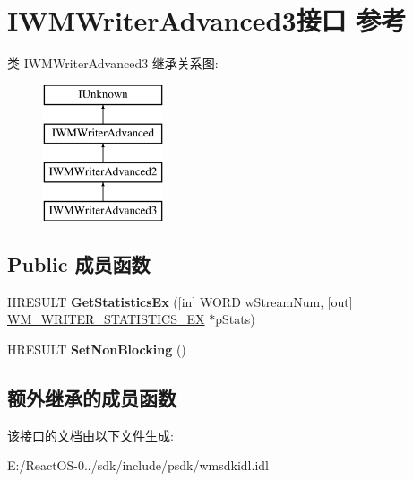 \hypertarget{interface_i_w_m_writer_advanced3}{}\section{I\+W\+M\+Writer\+Advanced3接口 参考}
\label{interface_i_w_m_writer_advanced3}
类 I\+W\+M\+Writer\+Advanced3 继承关系图\+:\begin{figure}[H]
\begin{center}
\leavevmode
\includegraphics[height=4.000000cm]{interface_i_w_m_writer_advanced3}
\end{center}
\end{figure}
\subsection*{Public 成员函数}
\begin{DoxyCompactItemize}
\item 
\mbox{\label{interface_i_w_m_writer_advanced3_aecc90814208425f9a3a9f89c82024372}} 
H\+R\+E\+S\+U\+LT {\bfseries Get\+Statistics\+Ex} (\mbox{[}in\mbox{]} W\+O\+RD w\+Stream\+Num, \mbox{[}out\mbox{]} \hyperlink{struct___w_m_writer_statistics_ex}{W\+M\+\_\+\+W\+R\+I\+T\+E\+R\+\_\+\+S\+T\+A\+T\+I\+S\+T\+I\+C\+S\+\_\+\+EX} $\ast$p\+Stats)
\item 
\mbox{\label{interface_i_w_m_writer_advanced3_a25903d209f2b2d1097a6257a197420fd}} 
H\+R\+E\+S\+U\+LT {\bfseries Set\+Non\+Blocking} ()
\end{DoxyCompactItemize}
\subsection*{额外继承的成员函数}


该接口的文档由以下文件生成\+:\begin{DoxyCompactItemize}
\item 
E\+:/\+React\+O\+S-\/0../sdk/include/psdk/wmsdkidl.\+idl\end{DoxyCompactItemize}
